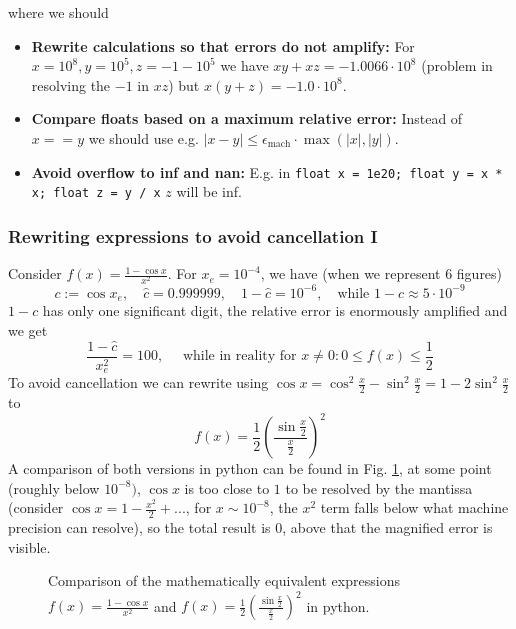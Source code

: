 where we should
\begin{itemize}
    \item \textcolor{green1}{\textbf{Rewrite calculations so that errors do not amplify:}} For $x = 10^8, y = 10^5, z = - 1 - 10^5$ we have $xy+xz=-1.0066\cdot10^8$ (problem in resolving the $-1$ in $xz$) but $x(y+z) = -1.0\cdot10^8$.
    \item \textcolor{green1}{\textbf{Compare floats based on a maximum relative error:}} Instead of $x == y$ we should use e.g. $|x-y| \leq \epsilon_{\text{mach}} \cdot \max(|x|,|y|)$.
    \item \textcolor{green1}{\textbf{Avoid overflow to inf and nan:}} E.g. in \texttt{float x = 1e20; float y = x * x; float z = y / x} $z$ will be inf. 
\end{itemize}

\subsubsection{Rewriting expressions to avoid cancellation I}
Consider $f(x) = \frac{1-\cos x}{x^2}$. For $x_e = 10^{-4}$, we have (when we represent 6 figures)
\begin{equation}
    c := \cos x_e, \quad \hat{c} = 0.999999, \quad 1-\hat{c} = 10^{-6}, \quad \text{while } 1-c \approx 5\cdot 10^{-9}
\end{equation}
$1-c$ has only one significant digit, the relative error is enormously amplified and we get
\begin{equation}
    \frac{1-\hat{c}}{x_e^2} = 100, \quad \text{ while in reality for } x\ne 0: 0 \leq f(x) \leq \frac{1}{2} 
\end{equation}
To avoid cancellation we can rewrite using $\cos x = \cos^2 \frac{x}{2} - \sin^2 \frac{x}{2} = 1 - 2 \sin^2 \frac{x}{2}$ to
\begin{equation}
    f(x) = \frac{1}{2} \left( \frac{\sin \frac{x}{2}}{\frac{x}{2}} \right)^2
\end{equation}
A comparison of both versions in python can be found in Fig. \ref{fig:cancellation_ex}, at some point (roughly below $10^{-8})$, $\cos x$ is too close to $1$ to be resolved 
by the mantissa (consider $\cos x = 1 - \frac{x^2}{2} + ...$, for $x \sim 10^{-8}$, the $x^2$ term falls below what machine precision can resolve), so the total result is $0$, above that the magnified error is visible.

\begin{figure}[!htb]
    \centering
    \hfill
    \caption{Comparison of the mathematically equivalent expressions $f(x) = \frac{1-\cos x}{x^2}$ and $f(x) = \frac{1}{2} \left( \frac{\sin \frac{x}{2}}{\frac{x}{2}} \right)^2$ in python.}
    \label{fig:cancellation_ex}
\end{figure}

